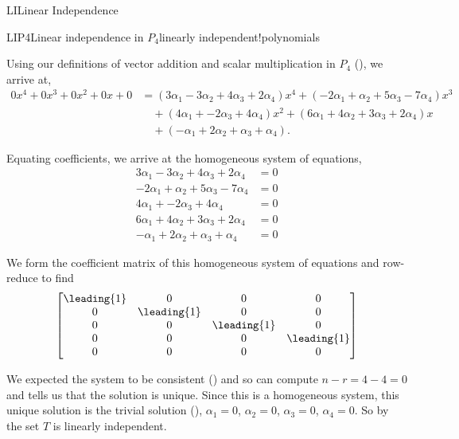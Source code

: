 \begin{subsect}{LI}{Linear Independence}
\begin{example}{LIP4}{Linear independence in $P_4$}{linearly independent!polynomials}
%
\begin{para}Using our definitions of vector addition and scalar multiplication in $P_4$ (), we arrive at,
%
\begin{align*}
0x^4+0x^3+0x^2+0x+0&=
\left(3\alpha_1-3\alpha_2+4\alpha_3+2\alpha_4\right)x^4+
\left(-2\alpha_1+\alpha_2+5\alpha_3-7\alpha_4\right)x^3\\
&\quad +
\left(4\alpha_1+              -2\alpha_3+4\alpha_4\right)x^2+
\left(6\alpha_1+4\alpha_2+3\alpha_3+2\alpha_4\right)x\\
&\quad +
\left(-\alpha_1+2\alpha_2+\alpha_3+\alpha_4\right).
\end{align*}
\end{para}
%
\begin{para}Equating coefficients, we arrive at the homogeneous system of equations,
%
\begin{align*}
3\alpha_1-3\alpha_2+4\alpha_3+2\alpha_4&=0\\
-2\alpha_1+\alpha_2+5\alpha_3-7\alpha_4&=0\\
4\alpha_1+              -2\alpha_3+4\alpha_4&=0\\
6\alpha_1+4\alpha_2+3\alpha_3+2\alpha_4&=0\\
-\alpha_1+2\alpha_2+\alpha_3+\alpha_4&=0
\end{align*}
\end{para}
%
\begin{para}We form the coefficient matrix of this homogeneous system of equations and row-reduce to find
%
\begin{equation*}
\begin{bmatrix}
\leading{1} & 0 & 0 & 0\\
0 & \leading{1} & 0 & 0\\
0 & 0 & \leading{1} & 0\\
0 & 0 & 0 & \leading{1}\\
0 & 0 & 0 & 0
\end{bmatrix}
\end{equation*}
\end{para}
%
\begin{para}We expected the system to be consistent () and so can compute $n-r=4-4=0$ and  tells us that the solution is unique.  Since this is a homogeneous system, this unique solution is the trivial solution (),  $\alpha_1=0$, $\alpha_2=0$, $\alpha_3=0$, $\alpha_4=0$.  So by  the set $T$ is linearly independent.\end{para}

\end{example}
\end{subsect}
